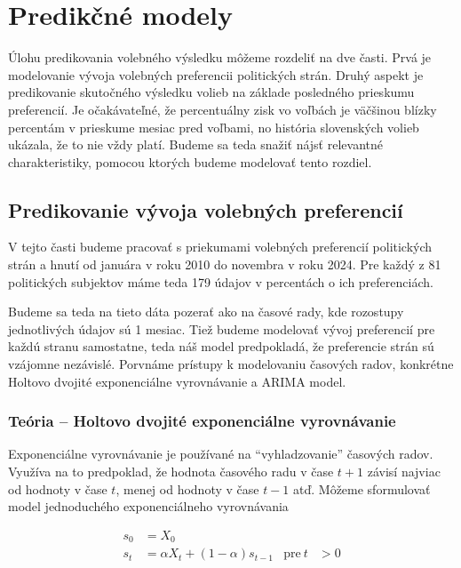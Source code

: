 \documentclass[main.tex]{subfiles}
\begin{document}
	
\section{Predikčné modely}	
\label{sec:models}

Úlohu predikovania volebného výsledku môžeme rozdeliť na dve časti. Prvá je modelovanie vývoja volebných preferencii politických strán. Druhý aspekt je predikovanie skutočného výsledku volieb na základe posledného prieskumu preferencií. Je očakávateľné, že percentuálny zisk vo voľbách je väčšinou blízky percentám v prieskume mesiac pred voľbami, no história slovenských volieb ukázala, že to nie vždy platí. Budeme sa teda snažiť nájsť relevantné charakteristiky, pomocou ktorých budeme modelovať tento rozdiel. 

\subsection{Predikovanie vývoja volebných preferencií}

V tejto časti budeme pracovať s priekumami volebných preferencií politických strán a hnutí od januára v roku 2010 do novembra v roku 2024. Pre každý z 81 politických subjektov máme teda 179 údajov v percentách o ich preferenciách. 

Budeme sa teda na tieto dáta pozerať ako na časové rady, kde rozostupy jednotlivých údajov sú 1 mesiac. Tiež budeme modelovať vývoj preferencií pre každú stranu samostatne, teda náš model predpokladá, že preferencie strán sú vzájomne nezávislé. Porvnáme prístupy k modelovaniu časových radov, konkrétne Holtovo dvojité exponenciálne vyrovnávanie a ARIMA model.


\subsubsection{Teória -- Holtovo dvojité exponenciálne vyrovnávanie} 

Exponenciálne vyrovnávanie je používané na \enquote{vyhladzovanie} časových radov. Využíva na to predpoklad, že hodnota časového radu v čase $t+1$ závisí najviac od hodnoty v čase $t$, menej od hodnoty v čase $t-1$ atď. Môžeme sformulovať model jednoduchého exponenciálneho vyrovnávania

\begin{align*}
	s_0 &= X_0 \\
	s_t &= \alpha X_t + (1-\alpha) s_{t-1}  & \text{pre}~t&>0 
\end{align*}
\end{document}

